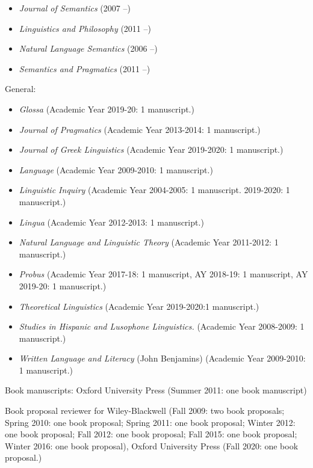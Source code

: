\documentclass[11pt]{article}
\begin{document}
\begin{itemize}
\item[] \textit{Journal of Semantics} (2007 --)
\item[] \textit{Linguistics and Philosophy} (2011 --)
\item[]\textit{Natural Language Semantics} (2006 --) 
\item[] \textit{Semantics and Pragmatics} (2011 --)
\end{itemize}

General:
\begin{itemize}
\item[] \textit{Glossa} (Academic Year 2019-20: 1 manuscript.)
\item[] \textit{Journal of Pragmatics} (Academic Year
  2013-2014: 1
  manuscript.)
  \item[] \textit{Journal of Greek Linguistics} (Academic Year
    2019-2020: 1
    manuscript.)
\item[] \textit{Language} (Academic Year  2009-2010: 1 manuscript.)
\item[] \textit{Linguistic Inquiry} (Academic Year  2004-2005: 1 manuscript. 2019-2020: 1 manuscript.)
\item[] \textit{Lingua} (Academic Year  2012-2013: 1 manuscript.)
\item[] \textit{Natural Language and Linguistic Theory} (Academic Year
  2011-2012: 1
  manuscript.)
  \item[] \textit{Probus} (Academic Year 2017-18: 1 manuscript, AY 2018-19: 1 manuscript, AY 2019-20: 1 manuscript.)
  \item[] \textit{Theoretical Linguistics} (Academic Year 2019-2020:1 manuscript.)
\item[] \textit{Studies in Hispanic and Lusophone Linguistics.} (Academic Year 
  2008-2009: 1 manuscript.)
\item[] \textit{Written Language and Literacy} (John Benjamins) (Academic Year 
  2009-2010: 1 manuscript.)
\end{itemize}


Book manuscripts: Oxford University Press
(Summer 2011: one book manuscript)

Book proposal reviewer for Wiley-Blackwell (Fall 2009: two book
proposals; Spring 2010: one book
proposal; Spring 2011: one book proposal; Winter 2012: one book
proposal; Fall 2012: one book proposal; Fall 2015: one book proposal; Winter 2016: one book proposal), Oxford University Press (Fall 2020: one book proposal.)
\end{document}
